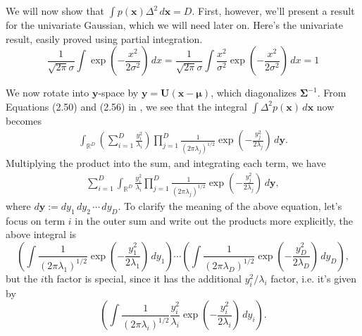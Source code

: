 \documentclass[12pt, a4paper]{article}
\newcommand{\R}{\mathbb{R}}
\newcommand{\vect}[1]{\bm{#1}}
\begin{document}
We will now show that $\int p(\vect{x}) \Delta^2 \, d\vect{x} = D$.
First, however, we'll present a result for the univariate Gaussian, which we will need later on. 
Here's the univariate result, easily proved using partial integration.
\begin{equation}
\label{eqn:ch2_problem15_a}
	\frac{1}{\sqrt{2 \pi} \sigma} \int \exp \left( - \frac{x^2}{2 \sigma^2}\right) \, dx = 
	\frac{1}{\sqrt{2 \pi} \sigma} \int \frac{x^2}{\sigma^2} \exp \left( - \frac{x^2}{2 \sigma^2}\right) \, dx = 1
\end{equation}


We now rotate into $\vect{y}$-space by $\vect{y} = \vect{U}(\vect{x} - \vect{\mu})$, which diagonalizes $\vect{\Sigma}^{-1}$.
From Equations (2.50) and (2.56) in \cite{bishop_pattern_2011}, we see that the integral $\int \Delta^2  p(\vect{x}) \, d\vect{x}$ now becomes
\begin{align*}
	\int_{\R^D} \left( \sum_{i=1}^{D} \frac{y_i^2}{\lambda_i} \right)
	\prod_{j=1}^{D} \frac{1}{(2 \pi \lambda_j)^{1/2}} 
	\exp \left( - \frac{y_j^2}{2 \lambda_j} \right) \, d \vect{y}.
\end{align*}
Multiplying the product into the sum, and integrating each term, we have
\begin{align*}
\sum_{i=1}^{D} \int_{\R^D}  \frac{y_i^2}{\lambda_i} 
\prod_{j=1}^{D} \frac{1}{(2 \pi \lambda_j)^{1/2}} 
\exp \left( - \frac{y_j^2}{2 \lambda_j} \right)  \, d \vect{y},
\end{align*}
where $d \vect{y} := d y_1 \, d y_2 \, \cdots \, d y_D$.
To clarify the meaning of the above equation, let's focus on term $i$ in the outer sum and write out the products more explicitly, the above integral is
\begin{equation}
\label{eqn:ch2_problem15_b}
	\left( \int \frac{1}{(2 \pi \lambda_1)^{1/2}} \exp \left( - \frac{y_1^2}{2 \lambda_1} \right) \, d y_1 \right)
	\cdots
	\left( \int \frac{1}{(2 \pi \lambda_D)^{1/2}} \exp \left( - \frac{y_D^2}{2 \lambda_D} \right) \, d y_D \right),
\end{equation}
but the $i$th factor is special, since it has the additional $y_i^2 / \lambda_i$ factor, i.e. it's given by
\begin{equation}
\label{eqn:ch2_problem15_c}
	\left( \int \frac{1}{(2 \pi \lambda_i)^{1/2}} \frac{y_i^2}{\lambda_i}   \exp \left( - \frac{y_i^2}{2 \lambda_i} \right) \, d y_i \right).
\end{equation}
\end{document}
